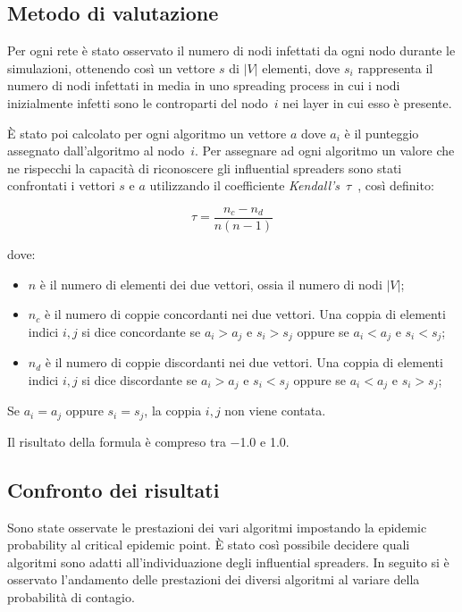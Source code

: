 \subsection{Metodo di valutazione}
Per ogni rete è stato osservato il numero di nodi infettati da ogni nodo durante le simulazioni, 
ottenendo così un vettore $s$ di $|V|$ elementi, dove $s_i$ rappresenta il numero di nodi 
infettati in media in uno spreading process in cui i nodi inizialmente infetti sono le controparti del 
nodo~$i$ nei layer in cui esso è presente.

È stato poi calcolato per ogni algoritmo un vettore $a$ dove $a_i$ 
è il punteggio assegnato dall'algoritmo al nodo~$i$.
Per assegnare ad ogni algoritmo un valore che ne rispecchi la capacità di riconoscere 
gli influential spreaders sono stati confrontati i vettori $s$ e $a$ utilizzando il coefficiente 
\textit{Kendall's}~$\tau$~\cite{kendall:tau}, 
così definito:

\begin{equation}
    \tau = \frac{n_c - n_d}{n(n-1)}
\end{equation}

dove:
\begin{itemize}
    \setlength\itemsep{0pt}
    \item $n$ è il numero di elementi dei due vettori, ossia il numero di nodi $|V|$;
    \item $n_c$ è il numero di coppie concordanti nei due vettori. Una coppia di elementi 
            indici $i, j$ si dice concordante se $a_i > a_j$ e $s_i > s_j$ oppure se $a_i < a_j$ e $s_i < s_j$;
    \item $n_d$ è il numero di coppie discordanti nei due vettori. Una coppia di elementi 
    indici $i, j$ si dice discordante se $a_i > a_j$ e $s_i < s_j$ oppure se $a_i < a_j$ e $s_i > s_j$;    
\end{itemize}

Se $a_i = a_j$ oppure $s_i = s_j$, la coppia $i, j$ non viene contata.

Il risultato della formula è compreso tra \num{-1.0} e {1.0}.

\subsection{Confronto dei risultati}

Sono state osservate le prestazioni dei vari algoritmi impostando la epidemic probability
al critical epidemic point. È stato così possibile decidere quali algoritmi sono adatti 
all'individuazione degli influential spreaders. In seguito si è osservato 
l'andamento delle prestazioni dei diversi algoritmi al variare della 
probabilità di contagio.

